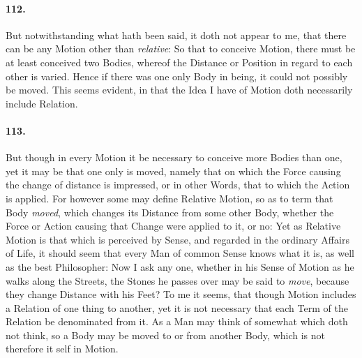 \documentclass[]{article}
\newenvironment{sectionbody}{\begin{multicols}{2}}{\end{multicols}}
\begin{document}
\begin{sectionbody}
\paragraph{112.} But notwithstanding what hath been said, it doth not appear to
me, that there can be any Motion other than \emph{relative}: So
that to conceive Motion, there must be at least conceived two
Bodies, whereof the Distance or Position in regard to each other
is varied.  Hence if there was one only Body in being, it could
not possibly be moved.  This seems evident, in that the Idea I
have of Motion doth necessarily include Relation.



\paragraph{113.} But though in every Motion it be necessary to conceive more
Bodies than one, yet it may be that one only is moved, namely
that on which the Force causing the change of distance is
impressed, or in other Words, that to which the Action is
applied.  For however some may define Relative Motion, so as to
term that Body \emph{moved}, which changes its Distance from
some other Body, whether the Force or Action causing that Change
were applied to it, or no: Yet as Relative Motion is that which
is perceived by Sense, and regarded in the ordinary Affairs of
Life, it should seem that every Man of common Sense knows what it
is, as well as the best Philosopher: Now I ask any one, whether
in his Sense of Motion as he walks along the Streets, the Stones
he passes over may be said to \emph{move}, because they change
Distance with his Feet? To me it seems, that though Motion
includes a Relation of one thing to another, yet it is not
necessary that each Term of the Relation be denominated from it.
As a Man may think of somewhat which doth not think, so a Body
may be moved to or from another Body, which is not therefore it
self in Motion.




\end{sectionbody}
\end{document}
